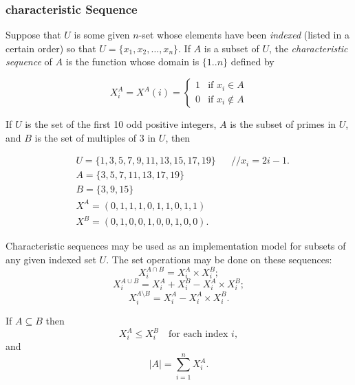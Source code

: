 \subsubsection{characteristic Sequence}
\begin{definition}
    Suppose that \( U \) is some given \( n \)-set whose elements have been \textit{indexed} (listed in a certain order) so that \( U = \{x_1, x_2, \ldots, x_n\} \). If \( A \) is a subset of \( U \), the \textit{characteristic sequence} of \( A \) is the function whose domain is \( \{1..n\} \) defined by

\[
X^A_i = X^A(i) = 
\begin{cases} 
1 & \text{if } x_i \in A \\
0 & \text{if } x_i \notin A 
\end{cases}
\]
\end{definition}

\begin{example}
    If \( U \) is the set of the first 10 odd positive integers, \( A \) is the subset of primes in \( U \), and \( B \) is the set of multiples of 3 in \( U \), then
    
    \[
    \begin{aligned}
    &U = \{1, 3, 5, 7, 9, 11, 13, 15, 17, 19\} &&// x_i = 2i - 1. \\
    &A = \{3, 5, 7, 11, 13, 17, 19\} \\
    &B = \{3, 9, 15\} \\
    &X^A = (0, 1, 1, 1, 0, 1, 1, 0, 1, 1) \\
    &X^B = (0, 1, 0, 0, 1, 0, 0, 1, 0, 0).
    \end{aligned}
    \]
    \end{example}

    Characteristic sequences may be used as an implementation model for subsets of any given indexed set \( U \). The set operations may be done on these sequences:
    \[
    X^{A \cap B}_i = X^A_i \times X^B_i;
    \]
    \[
    X^{A \cup B}_i = X^A_i + X^B_i - X^A_i \times X^B_i;
    \]
    \[
    X^{A \setminus B}_i = X^A_i - X^A_i \times X^B_i.
    \]
    
    If \( A \subseteq B \) then
    \[
    X^A_i \leq X^B_i \quad \text{for each index } i,
    \]
    and
    \[
    |A| = \sum_{i=1}^{n} X^A_i.
    \]

